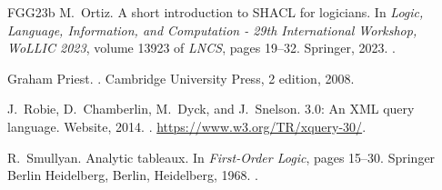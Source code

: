 \documentclass[10pt,a4paper]{amsart}
\theoremstyle{definition}
\theoremstyle{remark}
\begin{document}
\begin{thebibliography}{FGG{\etalchar{+}}23b}
M.~Ortiz.
\newblock A short introduction to {SHACL} for logicians.
\newblock In {\em Logic, Language, Information, and Computation - 29th International Workshop, WoLLIC 2023}, volume 13923 of {\em LNCS}, pages 19--32. Springer, 2023.
\newblock \href {https://doi.org/10.1007/978-3-031-39784-4\_2} {}.

Graham Priest.
.
\newblock Cambridge University Press, 2 edition, 2008.

J.~Robie, D.~Chamberlin, M.~Dyck, and J.~Snelson.
 3.0: An {XML} query language.
\newblock Website, 2014.
. \url{https://www.w3.org/TR/xquery-30/}.

R.~Smullyan.
\newblock Analytic tableaux.
\newblock In {\em First-Order Logic}, pages 15--30. Springer Berlin Heidelberg, Berlin, Heidelberg, 1968.
\newblock \href {https://doi.org/10.1007/978-3-642-86718-7_2} {}.

\end{thebibliography}
\end{document}
